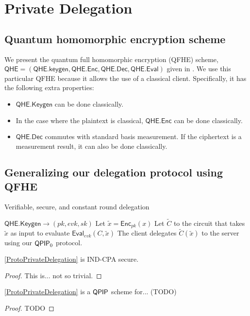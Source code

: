 \section{Private Delegation}


\subsection{Quantum homomorphic encryption scheme}


We present the quantum full homomorphic encryption (QFHE) scheme, $\mathsf{QHE}=(\mathsf{QHE.keygen}, \mathsf{QHE.Enc}, \mathsf{QHE.Dec}, \mathsf{QHE.Eval})$ given in \cite{mahadev_qfhe}. We use this particular QFHE because it allows the use of a classical client. Specifically, it has the following extra properties:
\begin{itemize}
	\item $\mathsf{QHE.Keygen}$ can be done classically.
	\item In the case where the plaintext is classical, $\mathsf{QHE.Enc}$ can be done classically.
	\item $\mathsf{QHE.Dec}$ commutes with standard basis measurement. If the ciphertext is a measurement result, it can also be done classically.
\end{itemize}

\subsection{Generalizing our delegation protocol using QFHE}

\begin{algorithm}
	\caption{Verifiable, secure, and constant round delegation}
	\label{ProtoPrivateDelegation}
	\begin{algorithmic}[1]
			\State $\mathsf{QHE.Keygen}\rightarrow(pk, evk, sk)$
			\State Let $\tilde{x}=\mathsf{Enc}_{pk}(x)$
			\State Let $\tilde{C}$ to the circuit that takes $\tilde{x}$ as input to evaluate $\mathsf{Eval}_{evk}(C, \tilde{x})$
			\State The client delegates $\tilde{C}(\tilde{x})$ to the server using our $\operatorname{\mathsf{QPIP}}_0$ protocol.
		\EndProcedure
	\end{algorithmic}
\end{algorithm}

\begin{thm}
	\autoref{ProtoPrivateDelegation} is IND-CPA secure.
\end{thm}
\begin{proof}
	This is... not so trivial.
\end{proof}

\begin{thm}
	\autoref{ProtoPrivateDelegation} is a $\operatorname{\mathsf{QPIP}}$ scheme for... (TODO) 
\end{thm}
\begin{proof}
	TODO
\end{proof}
